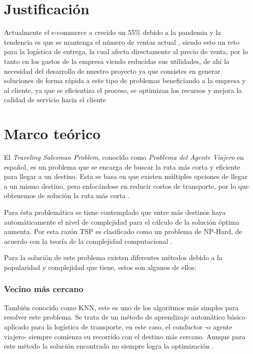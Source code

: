 \documentclass[journal]{IEEEtran}
\begin{document}
    \section{Justificación} \label{sec:justification}

        Actualmente el e-commerce a crecido un 55\% debido a la pandemia y la tendencia es que se mantenga el número de ventas actual \cite{koetsier-2022}, siendo esto un reto para la logística de entrega, la cual afecta directamente al precio de venta, por lo tanto en los gastos de la empresa viendo reducidas sus utilidades, de ahí la necesidad del desarrollo de nuestro proyecto ya que consistes en generar soluciones de forma rápida a este tipo de problemas beneficiando a la empresa y al cliente, ya que se eficientiza el proceso, se optimizan los recursos y mejora la calidad de servicio hacia el cliente

    \section{Marco teórico} \label{sec:theoretical}
    
        El \emph{Traveling Salesman Problem}, conocido como \emph{Problema del Agente Viajero} en español, es un problema que se encarga de buscar la ruta más corta y eficiente para llegar a un destino. Esta se basa en que existen múltiples opciones de llegar a un mismo destino, pero enfocándose en reducir costos de transporte, por lo que obtenemos de solución la ruta más corta \cite{trevelingProb}.

        Para ésta problemática se tiene contemplado que entre más destinos haya automáticamente el nivel de complejidad para el cálculo de la solución óptima aumenta. Por esta razón TSP es clasificado como un problema de NP-Hard, de acuerdo con la teoría de la complejidad computacional \cite{trevelingProb}.

        Para la solución de este problema existen diferentes métodos debido a la popularidad y complejidad que tiene, estos son algunos de ellos:
        
        \subsubsection{Vecino más cercano}
        
            También conocido como KNN, este es uno de los algoritmos más simples para resolver este problema. Se trata de un método de aprendizaje automático básico aplicado para la logística de transporte, en este caso, el conductor -o agente viajero- siempre comienza su recorrido con el destino más cercano. Aunque para este método la solución encontrada no siempre logra la optimización \cite{trevelingProb}.
\end{document}
